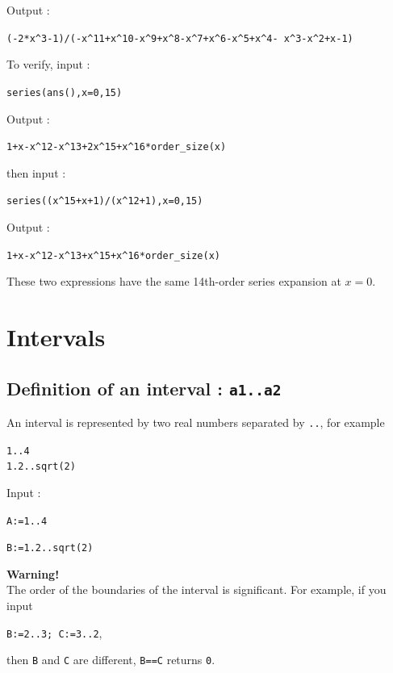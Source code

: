 \documentclass[a4paper,11pt]{book}
\begin{document}
Output :
\begin{center}{\tt (-2*x\verb|^|3-1)/(-x\verb|^|11+x\verb|^|10-x\verb|^|9+x\verb|^|8-x\verb|^|7+x\verb|^|6-x\verb|^|5+x\verb|^|4- x\verb|^|3-x\verb|^|2+x-1)}\end{center}
To verify, input :
\begin{center}{\tt series(ans(),x=0,15)}\end{center}
Output :
\begin{center}{\tt 1+x-x\verb|^|{12}-x\verb|^|{13}+2x\verb|^|{15}+x\verb|^|{16}*order\_size(x)}\end{center}
then input :
\begin{center}{\tt series((x\verb|^|15+x+1)/(\verb|x^|12+1),x=0,15)}\end{center}
Output :
\begin{center}{\tt 1+x-x\verb|^|{12}-x\verb|^|{13}+x\verb|^|{15}+x\verb|^|{16}*order\_size(x)}\end{center}
These two expressions have the same 14th-order series expansion at $x=0$.

\section{Intervals}
\subsection{Definition of an interval : {\tt a1..a2}}
An interval is represented by two real numbers 
separated by {\tt ..}, for example 
\begin{center}{\tt 1..4}\\
{\tt 1.2..sqrt(2)}
\end{center}
Input :
\begin{center}{\tt A:=1..4}\end{center}
\begin{center}{\tt B:=1.2..sqrt(2)}\end{center}
{\bf Warning!}\\
The order of the boundaries of the interval is significant. For
example, if you input 
\begin{center}
{\tt B:=2..3; C:=3..2},
\end{center}
then {\tt B} and {\tt C} are different, {\tt B==C} returns {\tt 0}.
\end{document}
